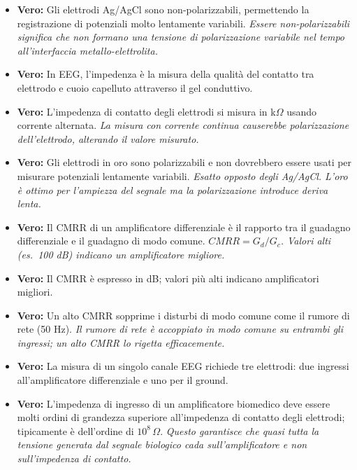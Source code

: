 \begin{itemize}
    \item \textbf{Vero:} Gli elettrodi Ag/AgCl sono non-polarizzabili, permettendo la registrazione di potenziali molto lentamente variabili.
    \textit{Essere non-polarizzabili significa che non formano una tensione di polarizzazione variabile nel tempo all'interfaccia metallo-elettrolita.}
    
    \item \textbf{Vero:} In EEG, l'impedenza è la misura della qualità del contatto tra elettrodo e cuoio capelluto attraverso il gel conduttivo.
    
    \item \textbf{Vero:} L'impedenza di contatto degli elettrodi si misura in k$\Omega$ usando corrente alternata.
    \textit{La misura con corrente continua causerebbe polarizzazione dell'elettrodo, alterando il valore misurato.}
    
    \item \textbf{Vero:} Gli elettrodi in oro sono polarizzabili e non dovrebbero essere usati per misurare potenziali lentamente variabili.
    \textit{Esatto opposto degli Ag/AgCl. L'oro è ottimo per l'ampiezza del segnale ma la polarizzazione introduce deriva lenta.}
    
    \item \textbf{Vero:} Il CMRR di un amplificatore differenziale è il rapporto tra il guadagno differenziale e il guadagno di modo comune.
    \textit{$CMRR = G_d / G_c$. Valori alti (es.\ 100 dB) indicano un amplificatore migliore.}
    
    \item \textbf{Vero:} Il CMRR è espresso in dB; valori più alti indicano amplificatori migliori.
    
    \item \textbf{Vero:} Un alto CMRR sopprime i disturbi di modo comune come il rumore di rete (50 Hz).
    \textit{Il rumore di rete è accoppiato in modo comune su entrambi gli ingressi; un alto CMRR lo rigetta efficacemente.}
    
    \item \textbf{Vero:} La misura di un singolo canale EEG richiede tre elettrodi: due ingressi all'amplificatore differenziale e uno per il ground.
    
    \item \textbf{Vero:} L'impedenza di ingresso di un amplificatore biomedico deve essere molti ordini di grandezza superiore all'impedenza di contatto degli elettrodi; tipicamente è dell'ordine di $10^8\,\Omega$.
    \textit{Questo garantisce che quasi tutta la tensione generata dal segnale biologico cada sull'amplificatore e non sull'impedenza di contatto.}
    

\end{itemize}
